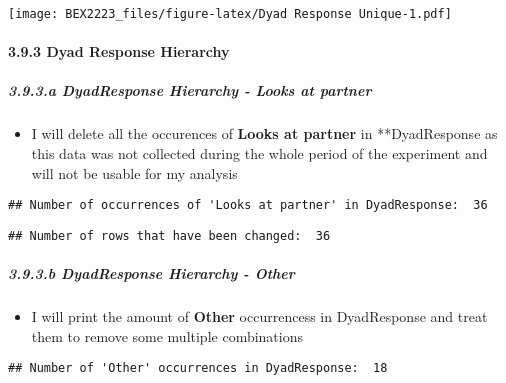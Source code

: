 \documentclass[
]{article}
\providecommand{\tightlist}{%
  \setlength{\itemsep}{0pt}\setlength{\parskip}{0pt}}
\begin{document}
\texttt{[image: BEX2223\_files/figure-latex/Dyad Response Unique-1.pdf]}

\hypertarget{dyad-response-hierarchy}{%
\paragraph{3.9.3 Dyad Response
Hierarchy}\label{dyad-response-hierarchy}}

\hypertarget{a-dyadresponse-hierarchy---looks-at-partner}{%
\subparagraph{3.9.3.a DyadResponse Hierarchy - Looks at
partner}\label{a-dyadresponse-hierarchy---looks-at-partner}}

\begin{itemize}
\tightlist
\item
  I will delete all the occurences of \textbf{Looks at partner} in
  **DyadResponse as this data was not collected during the whole period
  of the experiment and will not be usable for my analysis
\end{itemize}

\begin{verbatim}
## Number of occurrences of 'Looks at partner' in DyadResponse:  36
\end{verbatim}

\begin{verbatim}
## Number of rows that have been changed:  36
\end{verbatim}

\hypertarget{b-dyadresponse-hierarchy---other}{%
\subparagraph{3.9.3.b DyadResponse Hierarchy -
Other}\label{b-dyadresponse-hierarchy---other}}

\begin{itemize}
\tightlist
\item
  I will print the amount of \textbf{Other} occurrencess in DyadResponse
  and treat them to remove some multiple combinations
\end{itemize}

\begin{verbatim}
## Number of 'Other' occurrences in DyadResponse:  18
\end{verbatim}
\end{document}
